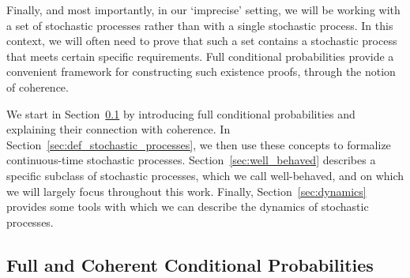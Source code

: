 \documentclass[10pt,a4paper]{paper}
\theoremstyle{definition}
\begin{document}
Finally, and most importantly, in our `imprecise' setting, we will be working with a set of stochastic processes rather than with a single stochastic process. In this context, we will often need to prove that such a set contains a stochastic process that meets certain specific requirements.
Full conditional probabilities provide a convenient framework for constructing such existence proofs, through the notion of coherence.

We start in Section~\ref{sec:cond_prob} by introducing full conditional probabilities and explaining their connection with coherence. In Section~\ref{sec:def_stochastic_processes}, we then use these concepts to formalize continuous-time stochastic processes. Section~\ref{sec:well_behaved} describes a specific subclass of stochastic processes, which we call well-behaved, and on which we will largely focus throughout this work. Finally, Section~\ref{sec:dynamics} provides some tools with which we can describe the dynamics of stochastic processes.

\subsection{Full and Coherent Conditional Probabilities}\label{sec:cond_prob}

\end{document}
